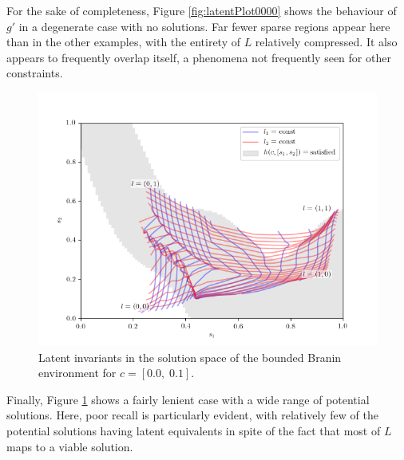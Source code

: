 \documentclass[../../main.tex]{subfiles}
\begin{document}
For the sake of completeness, Figure \ref{fig:latentPlot0000} shows the behaviour of $g'$ in a degenerate case with no solutions.
Far fewer sparse regions appear here than in the other examples, with the entirety of $L$ relatively compressed.
It also appears to frequently overlap itself, a phenomena not frequently seen for other constraints.
\begin{figure}[H]
    \begin{center}
    \includegraphics[width=\textwidth]{latentPlot0001}
    \caption{
        Latent invariants in the solution space of the bounded Branin environment for $c=[0.0,\;0.1]$.
    }
    \label{fig:latentPlot0001}
    \end{center}
\end{figure}
Finally, Figure \ref{fig:latentPlot0001} shows a fairly lenient case with a wide range of potential solutions.
Here, poor recall is particularly evident, with relatively few of the potential solutions having latent equivalents in spite of the fact that most of $L$ maps to a viable solution.
\end{document}
